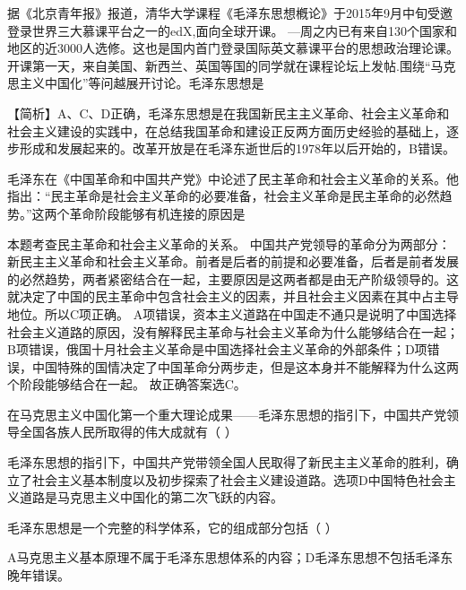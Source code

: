 \question 据《北京青年报》报道，清华大学课程《毛泽东思想槪论》于2015年9月中旬受邀登录世界三大慕课平台之一的edX,面向全球开课。
---周之内已有来自130个国家和地区的近3000人选修。这也是国内首门登录国际英文慕课平台的思想政治理论课。开课第一天，来自美国、新西兰、英国等国的同学就在课程论坛上发帖.围绕``马克思主义中国化''等问越展开讨论。毛泽东思想是
\par{}
\begin{solution}【简析】A、C、D正确，毛泽东思想是在我国新民主主义革命、社会主义革命和社会主义建设的实践中，在总结我国革命和建设正反两方面历史经验的基础上，逐步形成和发展起来的。改革开放是在毛泽东逝世后的1978年以后开始的，B错误。
\end{solution}
\question 毛泽东在《中国革命和中国共产党》中论述了民主革命和社会主义革命的关系。他指出：``民主革命是社会主义革命的必要准备，社会主义革命是民主革命的必然趋势。''这两个革命阶段能够有机连接的原因是
\par{}
\begin{solution}本题考查民主革命和社会主义革命的关系。
中国共产党领导的革命分为两部分：新民主主义革命和社会主义革命。前者是后者的前提和必要准备，后者是前者发展的必然趋势，两者紧密结合在一起，主要原因是这两者都是由无产阶级领导的。这就决定了中国的民主革命中包含社会主义的因素，并且社会主义因素在其中占主导地位。所以C项正确。
A项错误，资本主义道路在中国走不通只是说明了中国选择社会主义道路的原因，没有解释民主革命与社会主义革命为什么能够结合在一起；B项错误，俄国十月社会主义革命是中国选择社会主义革命的外部条件；D项错误，中国特殊的国情决定了中国革命分两步走，但是这本身并不能解释为什么这两个阶段能够结合在一起。
故正确答案选C。
\end{solution}
\question 在马克思主义中国化第一个重大理论成果------毛泽东思想的指引下，中国共产党领导全国各族人民所取得的伟大成就有（
）
\par{}
\begin{solution}毛泽东思想的指引下，中国共产党带领全国人民取得了新民主主义革命的胜利，确立了社会主义基本制度以及初步探索了社会主义建设道路。选项D中国特色社会主义道路是马克思主义中国化的第二次飞跃的内容。
\end{solution}
\question 毛泽东思想是一个完整的科学体系，它的组成部分包括（ ）
\par{}
\begin{solution}A马克思主义基本原理不属于毛泽东思想体系的内容；D毛泽东思想不包括毛泽东晚年错误。
\end{solution}
